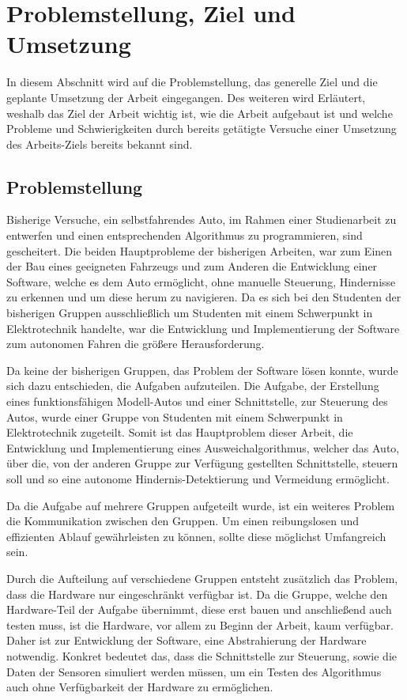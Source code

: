 \section{Problemstellung, Ziel und Umsetzung}
In diesem Abschnitt wird auf die Problemstellung, das generelle Ziel und die geplante Umsetzung der Arbeit eingegangen.
Des weiteren wird Erläutert, weshalb das Ziel der Arbeit wichtig ist, wie die Arbeit aufgebaut ist und welche Probleme und Schwierigkeiten durch bereits getätigte Versuche einer Umsetzung des Arbeits-Ziels bereits bekannt sind.

\subsection{Problemstellung}
Bisherige Versuche, ein selbstfahrendes Auto, im Rahmen einer Studienarbeit zu entwerfen und einen entsprechenden Algorithmus zu programmieren, sind gescheitert. 
Die beiden Hauptprobleme der bisherigen Arbeiten, war zum Einen der Bau eines geeigneten Fahrzeugs und zum Anderen die Entwicklung einer Software, welche es dem Auto ermöglicht, 
ohne manuelle Steuerung, Hindernisse zu erkennen und um diese herum zu navigieren.
Da es sich bei den Studenten der bisherigen Gruppen ausschließlich um Studenten mit einem Schwerpunkt in Elektrotechnik handelte, war die Entwicklung und Implementierung der Software zum autonomen Fahren die größere Herausforderung.

Da keine der bisherigen Gruppen, das Problem der Software lösen konnte, wurde sich dazu entschieden, die Aufgaben aufzuteilen. 
Die Aufgabe, der Erstellung eines funktionsfähigen Modell-Autos und einer Schnittstelle, zur Steuerung des Autos, wurde einer Gruppe von Studenten mit einem Schwerpunkt in Elektrotechnik zugeteilt. 
Somit ist das Hauptproblem dieser Arbeit, die Entwicklung und Implementierung eines Ausweichalgorithmus, 
welcher das Auto, über die, von der anderen Gruppe zur Verfügung gestellten Schnittstelle, steuern soll und so eine autonome Hindernis-Detektierung und Vermeidung ermöglicht.

Da die Aufgabe auf mehrere Gruppen aufgeteilt wurde, ist ein weiteres Problem die Kommunikation zwischen den Gruppen. 
Um einen reibungslosen und effizienten Ablauf gewährleisten zu können, sollte diese möglichst Umfangreich sein.

Durch die Aufteilung auf verschiedene Gruppen entsteht zusätzlich das Problem, dass die Hardware nur eingeschränkt verfügbar ist. 
Da die Gruppe, welche den Hardware-Teil der Aufgabe übernimmt, diese erst bauen und anschließend auch testen muss, ist die Hardware, vor allem zu Beginn der Arbeit, kaum verfügbar.
Daher ist zur Entwicklung der Software, eine Abstrahierung der Hardware notwendig. Konkret bedeutet das, dass die Schnittstelle zur Steuerung, sowie die Daten der Sensoren simuliert werden müssen, 
um ein Testen des Algorithmus auch ohne Verfügbarkeit der Hardware zu ermöglichen.

